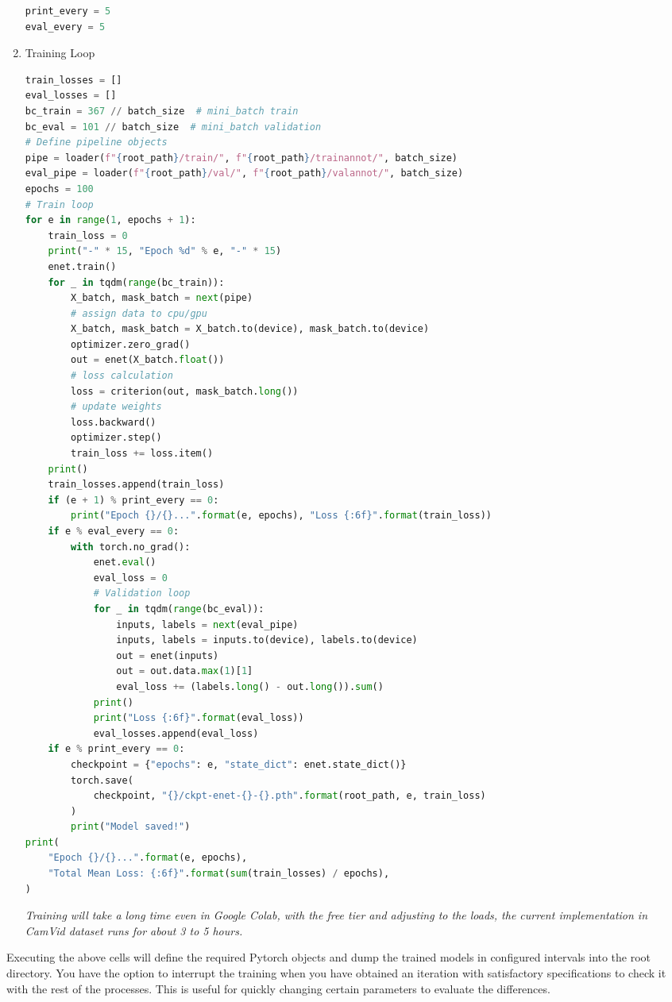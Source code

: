 \begin{enumerate}
\begin{lstlisting}[language=Python]
print_every = 5
eval_every = 5
                        \end{lstlisting}
    \item Training Loop
          \begin{lstlisting}[language=Python]
train_losses = []
eval_losses = []
bc_train = 367 // batch_size  # mini_batch train
bc_eval = 101 // batch_size  # mini_batch validation
# Define pipeline objects
pipe = loader(f"{root_path}/train/", f"{root_path}/trainannot/", batch_size)
eval_pipe = loader(f"{root_path}/val/", f"{root_path}/valannot/", batch_size)
epochs = 100
# Train loop
for e in range(1, epochs + 1):
    train_loss = 0
    print("-" * 15, "Epoch %d" % e, "-" * 15)
    enet.train()
    for _ in tqdm(range(bc_train)):
        X_batch, mask_batch = next(pipe)
        # assign data to cpu/gpu
        X_batch, mask_batch = X_batch.to(device), mask_batch.to(device)
        optimizer.zero_grad()
        out = enet(X_batch.float())
        # loss calculation
        loss = criterion(out, mask_batch.long())
        # update weights
        loss.backward()
        optimizer.step()
        train_loss += loss.item()
    print()
    train_losses.append(train_loss)
    if (e + 1) % print_every == 0:
        print("Epoch {}/{}...".format(e, epochs), "Loss {:6f}".format(train_loss))
    if e % eval_every == 0:
        with torch.no_grad():
            enet.eval()
            eval_loss = 0
            # Validation loop
            for _ in tqdm(range(bc_eval)):
                inputs, labels = next(eval_pipe)
                inputs, labels = inputs.to(device), labels.to(device)
                out = enet(inputs)
                out = out.data.max(1)[1]
                eval_loss += (labels.long() - out.long()).sum()
            print()
            print("Loss {:6f}".format(eval_loss))
            eval_losses.append(eval_loss)
    if e % print_every == 0:
        checkpoint = {"epochs": e, "state_dict": enet.state_dict()}
        torch.save(
            checkpoint, "{}/ckpt-enet-{}-{}.pth".format(root_path, e, train_loss)
        )
        print("Model saved!")
print(
    "Epoch {}/{}...".format(e, epochs),
    "Total Mean Loss: {:6f}".format(sum(train_losses) / epochs),
)
                        \end{lstlisting}
          \textit{Training will take a long time even in Google Colab, with the free tier and adjusting to the loads, the current implementation in CamVid dataset runs for about 3 to 5 hours.}
\end{enumerate}
Executing the above cells will define the required Pytorch objects and dump the trained models in configured intervals into the root directory. You have the option to interrupt the training when you have obtained an iteration with satisfactory specifications to check it with the rest of the processes. This is useful for quickly changing certain parameters to evaluate the differences.

